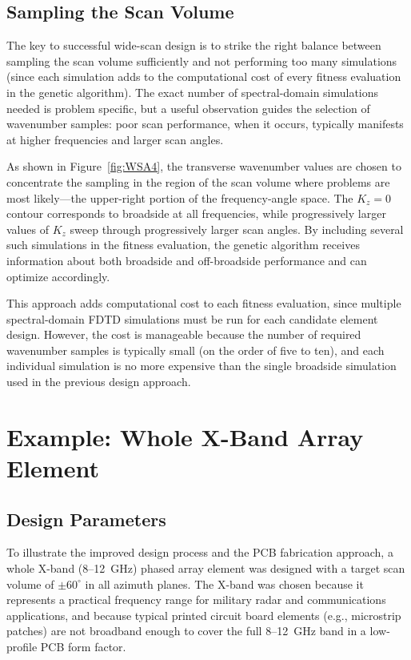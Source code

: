 \subsection{Sampling the Scan Volume}

The key to successful wide-scan design is to strike the right balance between sampling the scan volume sufficiently and not performing too many simulations (since each simulation adds to the computational cost of every fitness evaluation in the genetic algorithm).  The exact number of spectral-domain simulations needed is problem specific, but a useful observation guides the selection of wavenumber samples: poor scan performance, when it occurs, typically manifests at higher frequencies and larger scan angles.

As shown in Figure~\ref{fig:WSA4}, the transverse wavenumber values are chosen to concentrate the sampling in the region of the scan volume where problems are most likely---the upper-right portion of the frequency-angle space.  The $K_z = 0$ contour corresponds to broadside at all frequencies, while progressively larger values of $K_z$ sweep through progressively larger scan angles.  By including several such simulations in the fitness evaluation, the genetic algorithm receives information about both broadside and off-broadside performance and can optimize accordingly.

This approach adds computational cost to each fitness evaluation, since multiple spectral-domain FDTD simulations must be run for each candidate element design.  However, the cost is manageable because the number of required wavenumber samples is typically small (on the order of five to ten), and each individual simulation is no more expensive than the single broadside simulation used in the previous design approach.

\section{Example: Whole X-Band Array Element}

\subsection{Design Parameters}

To illustrate the improved design process and the PCB fabrication approach, a whole X-band (8--12~GHz) phased array element was designed with a target scan volume of $\pm 60^{\circ}$ in all azimuth planes.  The X-band was chosen because it represents a practical frequency range for military radar and communications applications, and because typical printed circuit board elements (e.g., microstrip patches) are not broadband enough to cover the full 8--12~GHz band in a low-profile PCB form factor.

